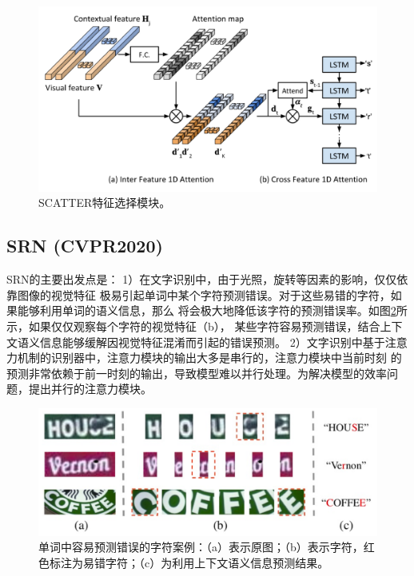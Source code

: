 \begin{figure}[H]
    \centering
    \includegraphics[width=.8\textwidth]{figure/recognition/scatter_feature_select.png} 
    \caption{SCATTER特征选择模块。} 
    \label{scatter_feature_select} 
\end{figure}

\subsection{SRN (CVPR2020)}
SRN\cite{2020srn}的主要出发点是：
1）在文字识别中，由于光照，旋转等因素的影响，仅仅依靠图像的视觉特征
极易引起单词中某个字符预测错误。对于这些易错的字符，如果能够利用单词的语义信息，那么
将会极大地降低该字符的预测错误率。如图\ref{srn_introduction}所示，如果仅仅观察每个字符的视觉特征（b），
某些字符容易预测错误，结合上下文语义信息能够缓解因视觉特征混淆而引起的错误预测。
2）文字识别中基于注意力机制的识别器中\cite{shi2018aster}，注意力模块的输出大多是串行的，注意力模块中当前时刻
的预测非常依赖于前一时刻的输出，导致模型难以并行处理。为解决模型的效率问题，提出并行的注意力模块。


\begin{figure}[H]
    \centering
    \includegraphics[width=.7\textwidth]{figure/recognition/srn_introduction.png} 
    \caption{单词中容易预测错误的字符案例：（a）表示原图；（b）表示字符，红色标注为易错字符；（c）为利用上下文语义信息预测结果。} 
    \label{srn_introduction} 
\end{figure}

